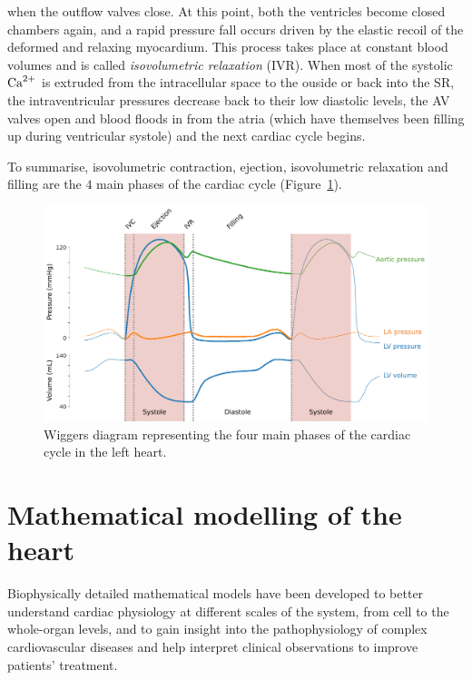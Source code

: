 when the outflow valves close. At this point, both the ventricles become closed chambers again, and a rapid pressure fall occurs driven by the elastic recoil of the deformed and relaxing myocardium. This process takes place at constant blood volumes and is called \textit{isovolumetric relaxation} (\acs{IVR}). When most of the systolic $\textrm{Ca}^{2+}$ is extruded from the intracellular space to the ouside or back into the SR, the intraventricular pressures decrease back to their low diastolic levels, the AV valves open and blood floods in from the atria (which have themselves been filling up during ventricular systole) and the next cardiac cycle begins.

\vspace{0.2cm}
To summarise, isovolumetric contraction, ejection, isovolumetric relaxation and filling are the $4$ main phases of the cardiac cycle (Figure~\ref{fig:wiggersdiagram}).

\begin{figure}[!ht]
    \myfloatalign
    \includegraphics[width=\textwidth]{figures/chapter01/wiggers_diagram.pdf}
    \caption{Wiggers diagram representing the four main phases of the cardiac cycle in the left heart.}
    \label{fig:wiggersdiagram}
\end{figure}


%
%
%
\section{Mathematical modelling of the heart}\label{sec:ch1mathematical_modelling_of_the_heart}
Biophysically detailed mathematical models have been developed to better understand cardiac physiology at different scales of the system, from cell to the whole-organ levels, and to gain insight into the pathophysiology of complex cardiovascular diseases and help interpret clinical observations to improve patients' treatment.


